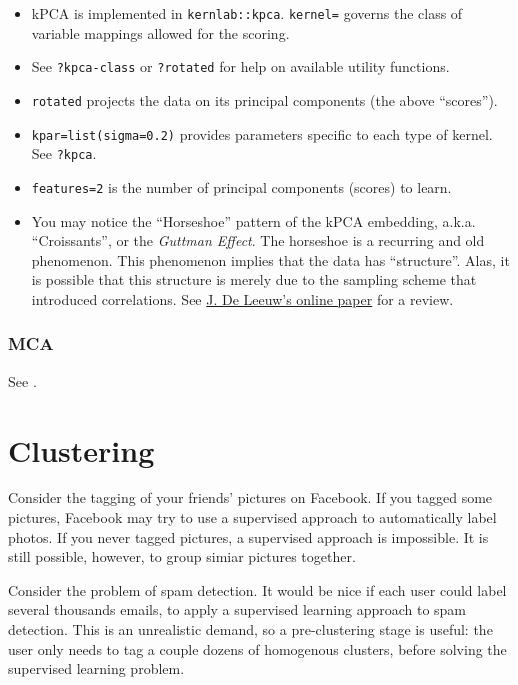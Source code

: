 \documentclass[]{book}
\providecommand{\tightlist}{%
  \setlength{\itemsep}{0pt}\setlength{\parskip}{0pt}}
\theoremstyle{definition}
\theoremstyle{definition}
\theoremstyle{definition}
\theoremstyle{remark}
\let\BeginKnitrBlock\begin \let\EndKnitrBlock\end
\begin{document}
\begin{itemize}
\tightlist
\item
  kPCA is implemented in \texttt{kernlab::kpca}. \texttt{kernel=}
  governs the class of variable mappings allowed for the scoring.
\item
  See \texttt{?\textquotesingle{}kpca-class\textquotesingle{}} or
  \texttt{?rotated} for help on available utility functions.
\item
  \texttt{rotated} projects the data on its principal components (the
  above ``scores'').
\item
  \texttt{kpar=list(sigma=0.2)} provides parameters specific to each
  type of kernel. See \texttt{?kpca}.
\item
  \texttt{features=2} is the number of principal components (scores) to
  learn.
\item
  You may notice the ``Horseshoe'' pattern of the kPCA embedding, a.k.a.
  ``Croissants'', or the \emph{Guttman Effect}. The horseshoe is a
  recurring and old phenomenon. This phenomenon implies that the data
  has ``structure''. Alas, it is possible that this structure is merely
  due to the sampling scheme that introduced correlations. See
  \href{https://rpubs.com/deleeuw/133786}{J. De Leeuw's online paper}
  for a review.
\end{itemize}

\subsubsection{MCA}\label{mca}

See \citet{izenman2008modern}.

\section{Clustering}\label{cluster}

\BeginKnitrBlock{example}
\protect\hypertarget{exm:photos}{}{\label{exm:photos} }Consider the tagging
of your friends' pictures on Facebook. If you tagged some pictures,
Facebook may try to use a supervised approach to automatically label
photos. If you never tagged pictures, a supervised approach is
impossible. It is still possible, however, to group simiar pictures
together.
\EndKnitrBlock{example}

\BeginKnitrBlock{example}
\protect\hypertarget{exm:spam}{}{\label{exm:spam} }Consider the problem of
spam detection. It would be nice if each user could label several
thousands emails, to apply a supervised learning approach to spam
detection. This is an unrealistic demand, so a pre-clustering stage is
useful: the user only needs to tag a couple dozens of homogenous
clusters, before solving the supervised learning problem.
\EndKnitrBlock{example}
\end{document}
